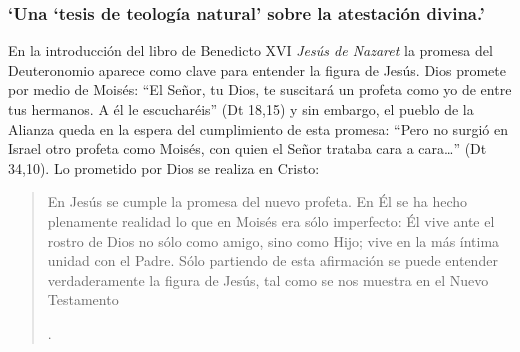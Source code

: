 \subsubsection{\enquote*{Una `tesis de teología natural' sobre la atestación divina.}}

En la introducción del libro de Benedicto XVI \emph{Jesús de Nazaret} la promesa del Deuteronomio aparece como clave para entender la figura de Jesús. Dios promete por medio de Moisés: \enquote{El Señor, tu Dios, te suscitará un profeta como yo de entre tus hermanos. A él le escucharéis} (Dt 18,15) y sin embargo, el pueblo de la Alianza queda en la espera del cumplimiento de esta promesa: \enquote{Pero no surgió en Israel otro profeta como Moisés, con quien el Señor trataba cara a cara\ldots} (Dt 34,10). Lo prometido por Dios se realiza en Cristo: \blockquote[{\Cite[28]{ratzinger2007jdenaz}}.]{En Jesús se cumple la promesa del nuevo profeta. En Él se ha hecho plenamente realidad lo que en Moisés era sólo imperfecto: Él vive ante el rostro de Dios no sólo como amigo, sino como Hijo; vive en la más íntima unidad con el Padre. Sólo partiendo de esta afirmación se puede entender verdaderamente la figura de Jesús, tal como se nos muestra en el Nuevo Testamento}

